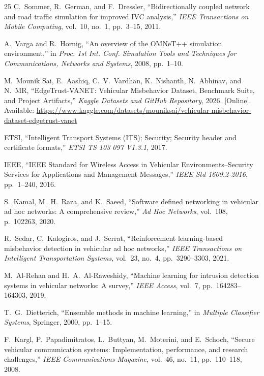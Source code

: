 \documentclass[conference]{IEEEtran}
\begin{document}
\begin{thebibliography}{25}
C.~Sommer, R.~German, and F.~Dressler,
``Bidirectionally coupled network and road traffic simulation for improved IVC analysis,''
\textit{IEEE Transactions on Mobile Computing}, vol.~10, no.~1, pp.~3--15, 2011.

A.~Varga and R.~Hornig,
``An overview of the OMNeT++ simulation environment,''
in \textit{Proc. 1st Int. Conf. Simulation Tools and Techniques for Communications, Networks and Systems}, 2008, pp.~1--10.

M.~Mounik Sai, E.~Aashiq, C.~V.~Vardhan, K.~Nishanth, N.~Abhinav, and N.~MR,
``EdgeTrust-VANET: Vehicular Misbehavior Dataset, Benchmark Suite, and Project Artifacts,''
\textit{Kaggle Datasets and GitHub Repository}, 2026. [Online]. Available: \url{https://www.kaggle.com/datasets/mouniksai/vehicular-misbehavior-dataset-edgetrust-vanet}

ETSI,
``Intelligent Transport Systems (ITS); Security; Security header and certificate formats,''
\textit{ETSI TS 103 097 V1.3.1}, 2017.

IEEE,
``IEEE Standard for Wireless Access in Vehicular Environments--Security Services for Applications and Management Messages,''
\textit{IEEE Std 1609.2-2016}, pp.~1--240, 2016.

S.~Kamal, M.~H.~Raza, and K.~Saeed,
``Software defined networking in vehicular ad hoc networks: A comprehensive review,''
\textit{Ad Hoc Networks}, vol.~108, p.~102263, 2020.

R.~Sedar, C.~Kalogiros, and J.~Serrat,
``Reinforcement learning-based misbehavior detection in vehicular ad hoc networks,''
\textit{IEEE Transactions on Intelligent Transportation Systems}, vol.~23, no.~4, pp.~3290--3303, 2021.

M.~Al-Rehan and H.~A.~Al-Raweshidy,
``Machine learning for intrusion detection systems in vehicular networks: A survey,''
\textit{IEEE Access}, vol.~7, pp.~164283--164303, 2019.

T.~G.~Dietterich,
``Ensemble methods in machine learning,''
in \textit{Multiple Classifier Systems}, Springer, 2000, pp.~1--15.

F.~Kargl, P.~Papadimitratos, L.~Buttyan, M.~Moterini, and E.~Schoch,
``Secure vehicular communication systems: Implementation, performance, and research challenges,''
\textit{IEEE Communications Magazine}, vol.~46, no.~11, pp.~110--118, 2008.


\end{thebibliography}
\end{document}

